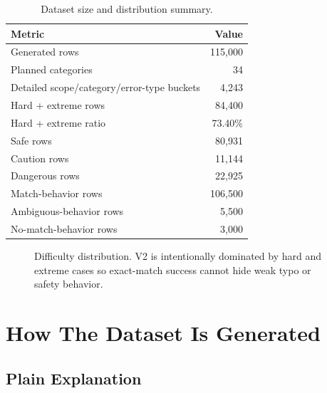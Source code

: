 \documentclass[11pt]{article}
\begin{document}
\begin{table}[H]
\centering
\small
\begin{tabular}{lr}
\toprule
\textbf{Metric} & \textbf{Value} \\
\midrule
Generated rows & 115,000 \\
Planned categories & 34 \\
Detailed scope/category/error-type buckets & 4,243 \\
Hard + extreme rows & 84,400 \\
Hard + extreme ratio & 73.40\% \\
Safe rows & 80,931 \\
Caution rows & 11,144 \\
Dangerous rows & 22,925 \\
Match-behavior rows & 106,500 \\
Ambiguous-behavior rows & 5,500 \\
No-match-behavior rows & 3,000 \\
\bottomrule
\end{tabular}
\caption{Dataset size and distribution summary.}
\end{table}

\begin{figure}[H]
\centering
{}
\caption{Difficulty distribution. V2 is intentionally dominated by hard and
extreme cases so exact-match success cannot hide weak typo or safety behavior.}
\end{figure}

\section{How The Dataset Is Generated}

\subsection*{Plain Explanation}
\end{document}
